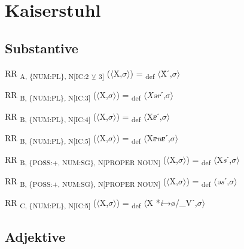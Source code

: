 {\section{Kaiserstuhl}

\subsection{Substantive}

\begin{exe}
 RR \textsubscript{A, \{NUM:PL\}, N[IC:2} \textsubscript{${\veebar}$}\textsubscript{ 3]} ($\langle$X,$\sigma $$\rangle$) = \textsubscript{def} $\langle$Ẍˊ,$\sigma $$\rangle$
\end{exe}

\begin{exe}
 RR \textsubscript{B, \{NUM:PL\}, N[IC:3]} ($\langle$X,$\sigma $$\rangle$) = \textsubscript{def} $\langle$\textit{Xər}ˊ,$\sigma $$\rangle$
\end{exe}

\begin{exe}
 RR \textsubscript{B, \{NUM:PL\}, N[IC:4]} ($\langle$X,$\sigma $$\rangle$) = \textsubscript{def} $\langle$X\textit{ɐ}ˊ,$\sigma $$\rangle$
\end{exe}

\begin{exe}
 RR \textsubscript{B, \{NUM:PL\}, N[IC:5]} ($\langle$X,$\sigma $$\rangle$) = \textsubscript{def} $\langle$X\textit{ɐnɐ}ˊ,$\sigma $$\rangle$
\end{exe}

\begin{exe}
 RR \textsubscript{B, \{POSS:+, NUM:SG\}, N[PROPER NOUN]} ($\langle$X,$\sigma $$\rangle$) = \textsubscript{def} $\langle$X\textit{s}ˊ,$\sigma $$\rangle$
\end{exe}

\begin{exe}
 RR \textsubscript{B, \{POSS:+, NUM:SG\}, N[PROPER NOUN]} ($\langle$X,$\sigma $$\rangle$) = \textsubscript{def} $\langle$\textit{əs}ˊ,$\sigma $$\rangle$
\end{exe}

\begin{exe}
 RR \textsubscript{C, \{NUM:PL\}, N[IC:5]} ($\langle$X,$\sigma $$\rangle$) = \textsubscript{def} $\langle$X *\textit{i}→ø/\_Vˊ,$\sigma $$\rangle$
\end{exe}

\subsection{Adjektive}

}
